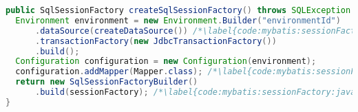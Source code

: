 
\begin{lstlisting}[language=Java, caption={Configuration of \Code{SqlSessionFactory} in Java}, label={code:mybatis:sessionFactory:java}]
public SqlSessionFactory createSqlSessionFactory() throws SQLException {
  Environment environment = new Environment.Builder("environmentId")
      .dataSource(createDataSource()) /*\label{code:mybatis:sessionFactory:java:dataSource}*/
      .transactionFactory(new JdbcTransactionFactory())
      .build();
  Configuration configuration = new Configuration(environment);
  configuration.addMapper(Mapper.class); /*\label{code:mybatis:sessionFactory:java:addMapper}*/
  return new SqlSessionFactoryBuilder()
      .build(sessionFactory); /*\label{code:mybatis:sessionFactory:java:sessionFactory}*/
}
\end{lstlisting}
